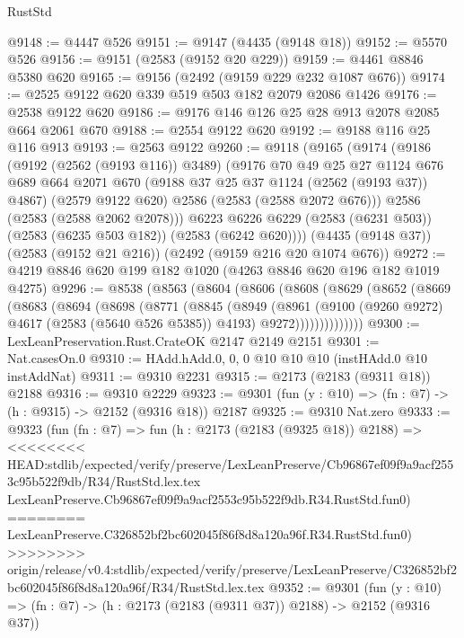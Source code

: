 \begin{lexlean}{RustStd}
\begin{coremodule}
{\begin{coremodule}
{{{{{{{{{{{{{{{@9148 := @4447 @526
@9151 := @9147 (@4435 (@9148 @18))
@9152 := @5570 @526
@9156 := @9151 (@2583 (@9152 @20 @229))
@9159 := @4461 @8846 @5380 @620
@9165 := @9156 (@2492 (@9159 @229 @232 @1087 @676))
@9174 := @2525 @9122 @620 @339 @519 @503 @182 @2079 @2086 @1426
@9176 := @2538 @9122 @620
@9186 := @9176 @146 @126 @25 @28 @913 @2078 @2085 @664 @2061 @670
@9188 := @2554 @9122 @620
@9192 := @9188 @116 @25 @116 @913
@9193 := @2563 @9122
@9260 := @9118
    (@9165
      (@9174
        (@9186
          (@9192 (@2562 (@9193 @116)) @3489)
          (@9176
            @70
            @49
            @25
            @27
            @1124
            @676
            @689
            @664
            @2071
            @670
            (@9188 @37 @25 @37 @1124 (@2562 (@9193 @37)) @4867)
            (@2579 @9122 @620)
            @2586
            (@2583 (@2588 @2072 @676)))
          @2586
          (@2583 (@2588 @2062 @2078)))
        @6223
        @6226
        @6229
        (@2583 (@6231 @503))
        (@2583 (@6235 @503 @182))
        (@2583 (@6242 @620))))
    (@4435 (@9148 @37))
    (@2583 (@9152 @21 @216))
    (@2492 (@9159 @216 @20 @1074 @676))
@9272 := @4219 @8846 @620 @199 @182 @1020 (@4263 @8846 @620 @196 @182 @1019 @4275)
@9296 := @8538
    (@8563
      (@8604
        (@8606
          (@8608
            (@8629
              (@8652
                (@8669
                  (@8683
                    (@8694
                      (@8698
                        (@8771
                          (@8845
                            (@8949
                              (@8961
                                (@9100 (@9260 @9272) @4617 (@2583 (@5640 @526 @5385)) @4193)
                                @9272))))))))))))))
@9300 := LexLeanPreservation.Rust.CrateOK @2147 @2149 @2151
@9301 := Nat.casesOn.{0}
@9310 := HAdd.hAdd.{0, 0, 0} @10 @10 @10 (instHAdd.{0} @10 instAddNat)
@9311 := @9310 @2231
@9315 := @2173 (@2183 (@9311 @18)) @2188
@9316 := @9310 @2229
@9323 := @9301 (fun (y : @10) => (fn : @7) -> (h : @9315) -> @2152 (@9316 @18)) @2187
@9325 := @9310 Nat.zero
@9333 := @9323
    (fun (fn : @7) =>
    fun (h : @2173 (@2183 (@9325 @18)) @2188) =>
<<<<<<<< HEAD:stdlib/expected/verify/preserve/LexLeanPreserve/Cb96867ef09f9a9acf2553c95b522f9db/R34/RustStd.lex.tex
    LexLeanPreserve.Cb96867ef09f9a9acf2553c95b522f9db.R34.RustStd.fun0)
========
    LexLeanPreserve.C326852bf2bc602045f86f8d8a120a96f.R34.RustStd.fun0)
>>>>>>>> origin/release/v0.4:stdlib/expected/verify/preserve/LexLeanPreserve/C326852bf2bc602045f86f8d8a120a96f/R34/RustStd.lex.tex
@9352 := @9301
    (fun (y : @10) => (fn : @7) -> (h : @2173 (@2183 (@9311 @37)) @2188) -> @2152 (@9316 @37))
}}}}}}}}}}}}}}}
\end{coremodule}}
\end{coremodule}
\end{lexlean}
